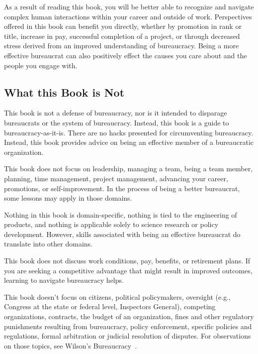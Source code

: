 As a result of reading this book, you will be better able to recognize and navigate complex human interactions within your career and outside of work. Perspectives offered in this book can benefit you directly, whether by promotion in rank or title, increase in pay, successful completion of a project, or through decreased stress derived from an improved understanding of  bureaucracy. Being a more effective bureaucrat can also positively effect the causes you care about and the people you engage with.





\subsection*{What this Book is Not}

This book is not a defense of bureaucracy, nor is it intended to disparage bureaucrats or the system of bureaucracy. Instead, this book is a guide to bureaucracy-as-it-is. There are no hacks presented for circumventing bureaucracy. Instead, this book provides advice on being an effective member of a bureaucratic organization.

This book does not focus on leadership, managing a team, being a team member, planning, time management, project management, advancing your career, promotions, or self-improvement. In the process of being a better bureaucrat, some lessons may apply in those domains.


Nothing in this book is domain-specific, nothing is tied to the engineering of products, and nothing is applicable solely to science research or policy development. However, skills associated with being an effective bureaucrat do translate into other domains.


This book does not discuss work conditions, pay, benefits, or retirement plans. If you are seeking a competitive advantage that might result in improved outcomes, learning to navigate bureaucracy helps.


This book doesn't focus on citizens, political policymakers, oversight (e.g., Congress at the state or federal level, Inspectors General), competing organizations, contracts, the budget of an organization, fines and other regulatory punishments resulting from bureaucracy, policy enforcement, specific policies and regulations, formal arbitration or judicial resolution of disputes. For observations on those topics, see Wilson's Bureaucracy~\cite{1991_Wilson}. 


